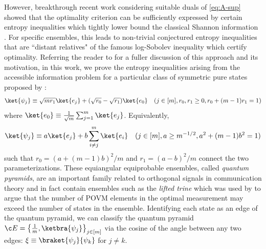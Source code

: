 \documentclass[11pt]{article}
\begin{document}
However, breakthrough recent work considering suitable duals of \eqref{eq:A-sup} showed that the optimality criterion can be sufficiently expressed by certain entropy inequalities which tightly lower bound the classical Shannon information \citep{holevo2022optimization, holevo2025quantum}. For specific ensembles, this leads to non-trivial conjectured entropy inequalities that are ``distant relatives" of the famous log-Sobolev inequality which certify optimality. Referring the reader to \citep{holevo2025quantum} for a fuller discussion of this approach and its motivation, in this work, we prove the entropy inequalities arising from the accessible information problem for a particular class of symmetric pure states proposed by \citep{englert2010well}:
\begin{equation}\label{eq:pyramid-r01}
    \ket{\psi_j}\equiv \sqrt{mr_1}\ket{e_j}+(\sqrt{r_0}-\sqrt{r_1})\ket{e_0}\quad (j\in[m],r_0,r_1\geq 0,r_0+(m-1)r_1=1)
\end{equation}
where $\ket{e_0}\equiv \frac{1}{\sqrt m}\sum_{j=1}^m \ket{e_j}$. Equivalently,
\begin{equation}\label{eq:pyramid-ab}
    \ket{\psi_j}\equiv a\ket{e_j}+b\sum_{i\neq j}^m\ket{e_i}\quad (j\in[m], a\geq m^{-1/2}, a^2+(m-1)b^2=1)
\end{equation}
such that $r_0=(a+(m-1)b)^2/m$ and $r_1=(a-b)^2/m$ connect the two parameterizations. 
These equiangular equiprobable ensembles, called \textit{quantum pyramids}, are an important family related to orthogonal signals in communication theory \citep{helstrom1976quantum} and in fact contain ensembles such as the \textit{lifted trine} which was used by \citep{shor2002number} to argue that the number of POVM elements in the optimal measurement may exceed the number of states in the ensemble. Identifying each state as an edge of the quantum pyramid, we can classify the quantum pyramid ${\c E}=\left\{\frac{1}{m},\ketbra{\psi_j}\right\}_{j\in [m]}$ via the cosine of the angle between any two edges: $\xi\equiv \braket{\psi_j}{\psi_k}$ for $j\neq k$.
\end{document}
